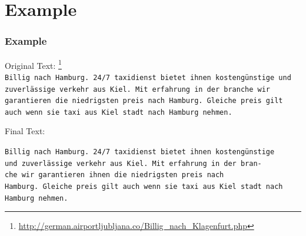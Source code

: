 \documentclass{beamer}
\begin{document}
\section{Example}
\begin{frame}

\frametitle{Example}
Original Text: \footnote{\tiny \url{http://german.airportljubljana.co/Billig\_nach\_Klagenfurt.php}} \\
\texttt{\scriptsize Billig nach Hamburg. 24/7 taxidienst bietet ihnen kostengünstige und \\
zuverlässige verkehr aus Kiel. Mit erfahrung in der branche wir \\
garantieren die niedrigsten preis nach Hamburg. Gleiche preis gilt \\
auch wenn sie taxi aus Kiel stadt nach Hamburg nehmen. \\}

Final Text: \par

\texttt{\footnotesize{B}\scriptsize illig nach Hamburg. 24/7 taxidienst bietet ihnen kostengünstige \\
\footnotesize{u}\scriptsize nd zuverlässige verkehr aus Kiel. Mit erfahrung in der bran- \\
\footnotesize{c}\scriptsize he wir garantieren ihnen die niedrigsten preis nach \\
\footnotesize{H}\scriptsize amburg. Gleiche preis gilt auch wenn sie taxi aus Kiel stadt nach \\
Hamburg nehmen. \\}
\end{frame}
\end{document}
